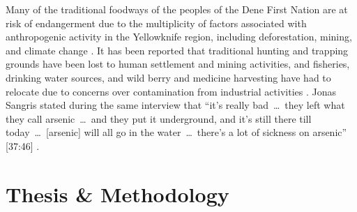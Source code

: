 \documentclass{report}
\begin{document}
\hspace{24pt} Many of the traditional foodways of the peoples of the Dene First Nation are at risk of endangerment due to the multiplicity of factors associated with anthropogenic activity in the Yellowknife region, including deforestation, mining, and climate change \parencite{denefoodwaysontologies}.
It has been reported that traditional hunting and trapping grounds have been lost to human settlement and mining activities, and fisheries, drinking water sources, and wild berry and medicine harvesting have had to relocate due to concerns over contamination from industrial activities \parencite{riskperceptions}. Jonas Sangris stated during the same interview that ``it's really bad~\ldots~they left what they call arsenic~\ldots~and they put it underground, and it's still there till today~\ldots~[arsenic] will all go in the water~\ldots~there's a lot of sickness on arsenic'' [37:46] \parencite{jonassangris}.




\section{Thesis \& Methodology}



\end{document}
